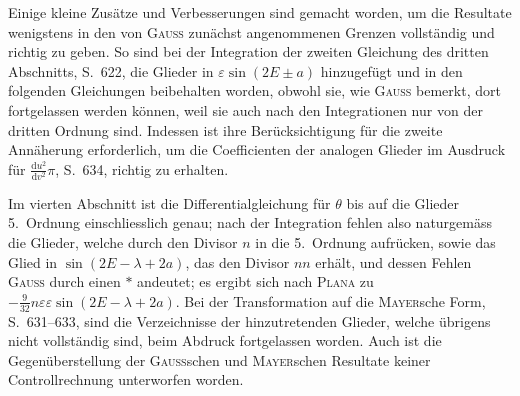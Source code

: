 \par\noindent\hspace*{\parindent}Einige kleine Zusätze und Verbesserungen sind gemacht worden, um die Resultate wenigstens in den
von \textsc{Gauss} zunächst angenommenen Grenzen vollständig und richtig zu geben. So sind bei der Integration
der zweiten Gleichung des dritten Abschnitts, S.~622, die Glieder in \(\varepsilon\sin(2E\pm a)\) hinzugefügt und in
den folgenden Gleichungen beibehalten worden, obwohl sie, wie \textsc{Gauss} bemerkt, dort fortgelassen werden
können, weil sie auch nach den Integrationen nur von der dritten Ordnung sind. Indessen ist ihre Berücksichtigung
für die zweite Annäherung erforderlich, um die Coefficienten der analogen Glieder im Ausdruck
für \(\frac{\mathrm du^2}{\mathrm dv^2}\pi\), S.~634, richtig zu erhalten.

\par\noindent\hspace*{\parindent}Im vierten Abschnitt ist die Differentialgleichung für \(\theta\) bis auf die Glieder 5.~Ordnung einschliesslich
genau; nach der Integration fehlen also naturgemäss die Glieder, welche durch den Divisor \(n\) in die
5.~Ordnung aufrücken, sowie das Glied in \(\sin(2E-\lambda+2a)\), das den Divisor \(nn\) erhält, und dessen
Fehlen \textsc{Gauss} durch einen \(*\) andeutet; es ergibt sich nach \textsc{Plana} zu \(-\frac{9}{32}n\varepsilon\varepsilon\sin(2E-\lambda+2a)\).
Bei der Transformation auf die \textsc{Mayer}sche Form, S.~631--633, sind die Verzeichnisse der hinzutretenden Glieder,
welche übrigens nicht vollständig sind, beim Abdruck fortgelassen worden. Auch ist die Gegenüberstellung
der \textsc{Gauss}schen und \textsc{Mayer}schen Resultate keiner Controllrechnung unterworfen worden.

